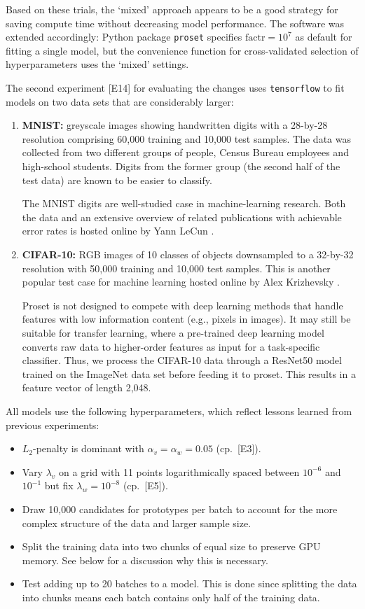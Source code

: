 %
Based on these trials, the `mixed' approach appears to be a good strategy for saving compute time without decreasing model performance.
The software was extended accordingly: Python package \texttt{proset} specifies $\text{factr}=10^7$ as default for fitting a single model, but the convenience function for cross-validated selection of hyperparameters uses the `mixed' settings.\par
%
The second experiment [E14] for evaluating the changes uses \texttt{tensorflow} to fit models on two data sets that are considerably larger:
%
\begin{enumerate}
\item\textbf{MNIST:} greyscale images showing handwritten digits with a 28-by-28 resolution comprising
60,000 training and 10,000 test samples.
The data was collected from two different groups of people, Census Bureau employees and high-school students.
Digits from the former group (the second half of the test data) are known to be easier to classify.\par
%
The MNIST digits are well-studied case in machine-learning research.
Both the data and an extensive overview of related publications with achievable error rates is hosted online by Yann LeCun \cite{LeCun_98}.
%
\item\textbf{CIFAR-10:} RGB images of 10 classes of objects downsampled to a 32-by-32 resolution with 50,000 training and 10,000 test samples.
This is another popular test case for machine learning hosted online by Alex Krizhevsky \cite{Krizhevsky_09}.\par
%
Proset is not designed to compete with deep learning methods that handle features with low information content (e.g., pixels in images).
It may still be suitable for transfer learning, where a pre-trained deep learning model converts raw data to higher-order features as input for a task-specific classifier.
Thus, we process the CIFAR-10 data through a ResNet50 \cite{He_15} model trained on the ImageNet \cite{Russakovsky_15} data set before feeding it to proset.
This results in a feature vector of length 2,048.
\end{enumerate}
%
All models use the following hyperparameters, which reflect lessons learned from previous experiments:
%
\begin{itemize}
\item $L_2$-penalty is dominant with $\alpha_v=\alpha_w=0.05$ (cp.\ [E3]).
%
\item Vary $\lambda_v$ on a grid with 11 points logarithmically spaced between $10^{-6}$ and $10^{-1}$ but fix $\lambda_w=10^{-8}$ (cp.\ [E5]).
%
\item Draw 10,000 candidates for prototypes per batch to account for the more complex structure of the data and larger sample size.
%
\item Split the training data into two chunks of equal size to preserve GPU memory.
See below for a discussion why this is necessary.
%
\item Test adding up to 20 batches to a model.
This is done since splitting the data into chunks means each batch contains only half of the training data.
\end{itemize}

